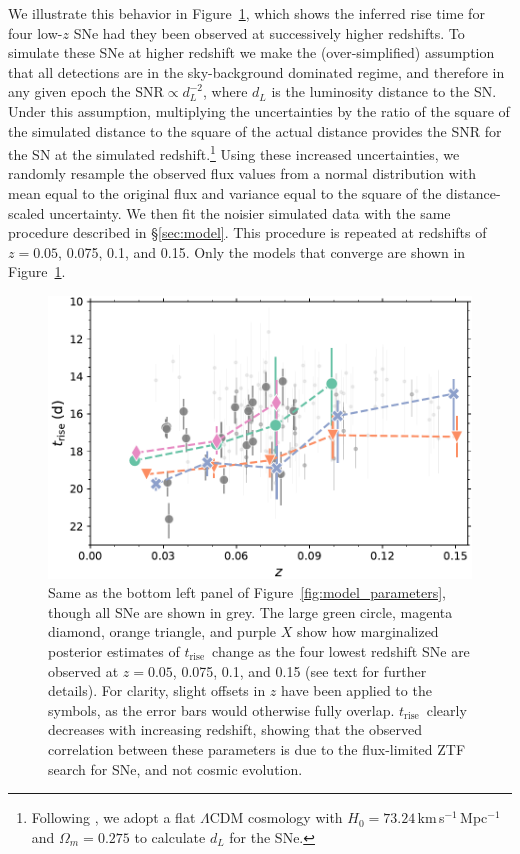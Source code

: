 \documentclass[twocolumn]{./aastex63}
\newcommand{\trise}{$t_\mathrm{rise}$}
\begin{document}
We illustrate this behavior in Figure~\ref{fig:high_z_systematic}, which shows
the inferred rise time for four low-$z$ SNe had they been observed at
successively higher redshifts. To simulate these SNe at higher redshift we make
the (over-simplified) assumption that all detections are in the sky-background
dominated regime, and therefore in any given epoch the $\mathrm{SNR} \propto
d_L^{-2}$, where $d_L$ is the luminosity distance to the SN. Under this
assumption, multiplying the uncertainties by the ratio of the square of the
simulated distance to the square of the actual distance provides the SNR for the
SN at the simulated redshift.\footnote{Following \citet{Yao19}, we adopt a flat
$\Lambda$CDM cosmology with $H_0 = 73.24$\,km\,s$^{-1}$\,Mpc$^{-1}$
\citep{Riess16} and $\Omega_m = 0.275$ \citep{Amanullah10} to calculate $d_L$
for the SNe.} Using these increased uncertainties, we randomly resample the
observed flux values from a normal distribution with mean equal to the original
flux and variance equal to the square of the distance-scaled uncertainty. We
then fit the noisier simulated data with the same procedure described in
\S\ref{sec:model}. This procedure is repeated at redshifts of $z = 0.05$,
0.075, 0.1, and 0.15. Only the models that converge are shown in
Figure~\ref{fig:high_z_systematic}.

\begin{figure}
    \centering
    \includegraphics[width=1\linewidth]{./figures/high_z_systematic.pdf}
    \caption{Same as the bottom left panel of Figure~\ref{fig:model_parameters},
    though all SNe are shown in grey. The large green circle, magenta diamond,
    orange triangle, and purple $X$ show how marginalized posterior estimates of
    \trise\ change as the four lowest redshift SNe are observed at $z = 0.05$,
    0.075, 0.1, and 0.15 (see text for further details). For clarity, slight
    offsets in $z$ have been applied to the symbols, as the error bars would
    otherwise fully overlap. \trise\ clearly decreases with increasing redshift,
    showing that the observed correlation between these parameters is due to the
    flux-limited ZTF search for SNe, and not cosmic evolution.}
    \label{fig:high_z_systematic}
\end{figure}
\end{document}
